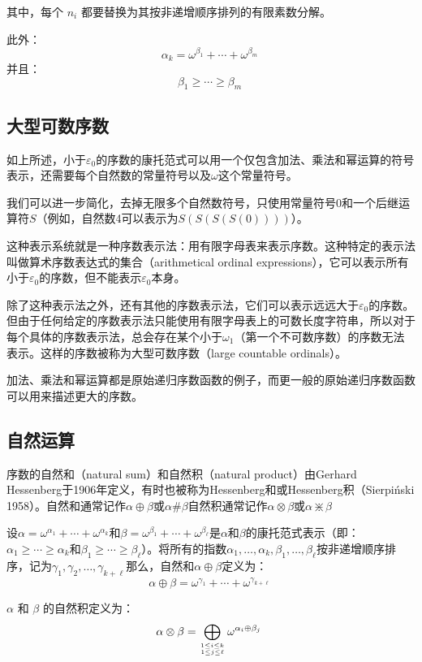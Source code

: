 其中，每个 \(n_i\) 都要替换为其按非递增顺序排列的有限素数分解。

此外：
\[
\alpha_k = \omega^{\beta_1} + \cdots + \omega^{\beta_m}~
\]
并且：
\[
\beta_1 \geq \cdots \geq \beta_m~
\]
\subsection{大型可数序数} 
如上所述，小于\(\varepsilon_0\)的序数的康托范式可以用一个仅包含加法、乘法和幂运算的符号表示，还需要每个自然数的常量符号以及\(\omega\)这个常量符号。  

我们可以进一步简化，去掉无限多个自然数符号，只使用常量符号\(0\)和一个后继运算符\(S\)（例如，自然数4可以表示为\(S(S(S(S(0))))\)）。  

这种表示系统就是一种序数表示法：用有限字母表来表示序数。这种特定的表示法叫做算术序数表达式的集合（arithmetical ordinal expressions），它可以表示所有小于\(\varepsilon_0\)的序数，但不能表示\(\varepsilon_0\)本身。  

除了这种表示法之外，还有其他的序数表示法，它们可以表示远远大于\(\varepsilon_0\)的序数。但由于任何给定的序数表示法只能使用有限字母表上的可数长度字符串，所以对于每个具体的序数表示法，总会存在某个小于\(\omega_1\)（第一个不可数序数）的序数无法表示。这样的序数被称为大型可数序数（large countable ordinals）。

加法、乘法和幂运算都是原始递归序数函数的例子，而更一般的原始递归序数函数可以用来描述更大的序数。
\subsection{自然运算} 
序数的自然和（natural sum）和自然积（natural product）由Gerhard Hessenberg于1906年定义，有时也被称为Hessenberg和或Hessenberg积（Sierpiński 1958）。自然和通常记作\(\alpha \oplus \beta\)或\(\alpha \# \beta\)自然积通常记作\(\alpha \otimes \beta\)或\(\alpha \divideontimes \beta\)  

设\(\alpha = \omega^{\alpha_1} + \cdots + \omega^{\alpha_k}\)和\(\beta = \omega^{\beta_1} + \cdots + \omega^{\beta_\ell}\)是\(\alpha\)和\(\beta\)的康托范式表示（即：\(\alpha_1 \geq \cdots \geq \alpha_k\)和\(\beta_1 \geq \cdots \geq \beta_\ell\)）。将所有的指数\(\alpha_1, \ldots, \alpha_k, \beta_1, \ldots, \beta_\ell\)按非递增顺序排序，记为\(\gamma_1, \gamma_2, \ldots, \gamma_{k+\ell}\)那么，自然和\(\alpha \oplus \beta\)定义为：
\[
\alpha \oplus \beta = \omega^{\gamma_1} + \cdots + \omega^{\gamma_{k+\ell}}~
\]

\(\alpha\) 和 \(\beta\) 的自然积定义为：
\[
\alpha \otimes \beta = \bigoplus_{1 \leq i \leq k \atop 1 \leq j \leq \ell} \omega^{\alpha_i \oplus \beta_j}~
\]

